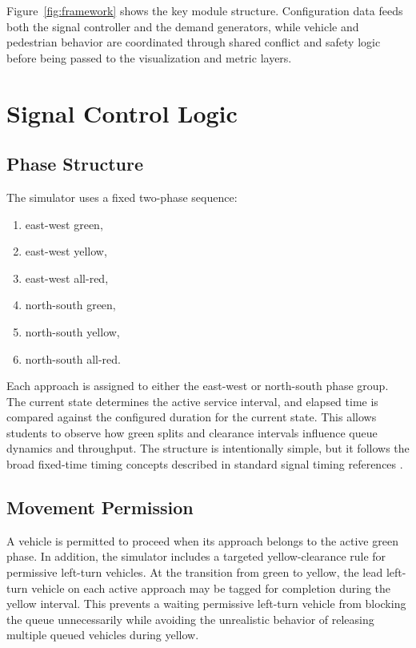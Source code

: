 \documentclass[conference]{IEEEtran}
\begin{document}
Figure~\ref{fig:framework} shows the key module structure. Configuration data feeds both the signal controller and the demand generators, while vehicle and pedestrian behavior are coordinated through shared conflict and safety logic before being passed to the visualization and metric layers.

\section{Signal Control Logic}
\subsection{Phase Structure}
The simulator uses a fixed two-phase sequence:
\begin{enumerate}
\item east-west green,
\item east-west yellow,
\item east-west all-red,
\item north-south green,
\item north-south yellow,
\item north-south all-red.
\end{enumerate}

Each approach is assigned to either the east-west or north-south phase group. The current state determines the active service interval, and elapsed time is compared against the configured duration for the current state. This allows students to observe how green splits and clearance intervals influence queue dynamics and throughput. The structure is intentionally simple, but it follows the broad fixed-time timing concepts described in standard signal timing references \cite{webster1958,stm2015}.

\subsection{Movement Permission}
A vehicle is permitted to proceed when its approach belongs to the active green phase. In addition, the simulator includes a targeted yellow-clearance rule for permissive left-turn vehicles. At the transition from green to yellow, the lead left-turn vehicle on each active approach may be tagged for completion during the yellow interval. This prevents a waiting permissive left-turn vehicle from blocking the queue unnecessarily while avoiding the unrealistic behavior of releasing multiple queued vehicles during yellow.
\end{document}
